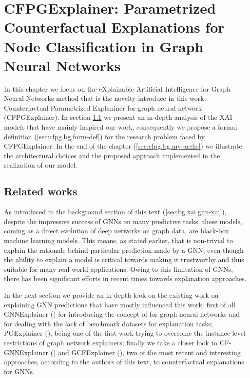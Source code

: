 \documentclass[binding=0.6cm]{sapthesis}
\newcommand{\mycite}[1]{(\cite{#1})}
\begin{document}
\chapter[CFPGExplainer]{CFPGExplainer: Parametrized Counterfactual Explanations for Node Classification in Graph Neural Networks}
\label{chap:3-CFPG}
In this chapter we focus on the eXplainable Artificial Intelligence for Graph Neural Networks method that is the novelty introduce in this work: Counterfactual Parametrized Explaniner for graph neural network (CFPGExplainer). In section \ref{sec:cfpg.bg} we present an in-depth analysis of the XAI models that have mainly inspired our work, consequently we propose a formal definition (\cref{sec:cfpg.bg.form-def}) for the research problem faced by CFPGExplainer. In the end of the chapter (\cref{sec:cfpg.bg.my-archs}) we illustrate the architectural choices and the proposed approach implemented in the realization of our model.

\section{Related works}
\label{sec:cfpg.bg}
As introduced in the background section of this text (\cref{sec:bg.xai.gnn-xai}), despite the impressive success of GNNs on many predictive tasks, these models, coming as a direct evolution of deep networks on graph data, are black-box machine learning models. This means, as stated earlier, that is non-trivial to explain the rationale behind particular prediction made by a GNN, even though the ability to explain a model is critical towards making it trustworthy and thus suitable for many real-world applications. Owing to this limitation of GNNs, there has been significant efforts in recent times towards explanation approaches. 

In the next section we provide an in-depth look on the existing work on explaining GNN predictions that have mostly influenced this work: first of all GNNExplainer \mycite{ying2019-gnnexplainer} for introducing the concept of  for graph neural networks and for dealing with the lack of benchmark datasets for explanation tasks; PGExplainer \mycite{luo2020-pgexplainer}, being one of the first work trying to overcome the instance-level restrictions of graph network explainers; finally we take a closer look to CF-GNNExplainer \mycite{lucic2022-cfgnnexplainer} and GCFExplainer \mycite{huang2023-globalCF}, two of the most recent and interesting approaches, according to the authors of this text, to counterfactual explanations for GNNs.
\end{document}
